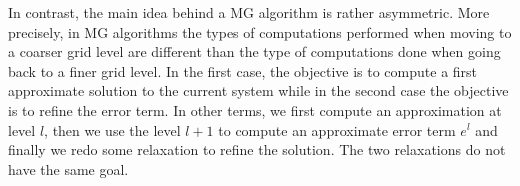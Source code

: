 In contrast, the main idea behind a MG algorithm is rather asymmetric. More
precisely, in MG algorithms the types of computations performed when moving to
a coarser grid level are different than the type of computations done when
going back to a finer grid level. In the first case, the objective is to
compute a first approximate solution to the current system while in the second
case the objective is to refine the error term. In other terms, we first
compute an approximation at level $l$, then we use the level $l+1$ to compute
an approximate error term $e^l$ and finally we redo some relaxation to refine
the solution. The two relaxations do not have the same goal.

\begin{figure}
    \centering
    \\

\end{figure}
